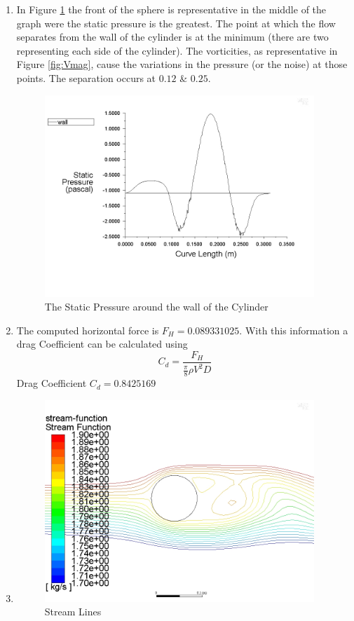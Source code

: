 \documentclass[11pt]{article}
\begin{document}
\begin{enumerate}
\item In Figure \ref{fig:pressure} the front of the sphere is representative in the
middle of the graph were the static pressure is the greatest. The point at which the flow separates from the wall of the cylinder is at the minimum (there are two representing each side of the cylinder). The vorticities, as representative in Figure \ref{fig:Vmag}, cause the variations in the pressure (or the noise) at those points. The separation occurs at  $0.12$ \& $0.25$.
\begin{figure}[H]
\centering
\includegraphics[width=4in]{curve_length_vs_static_pressure.jpg}
\caption{The Static Pressure around the wall of the Cylinder}
\label{fig:pressure}
\end{figure}

\item The computed horizontal force is $F_H = 0.089331025 $. With this information a drag
Coefficient can be calculated using $$C_d = \frac{F_H}{\frac{\pi}{8}\rho V^2 D}$$ Drag Coefficient $C_d = 0.8425169$ 

\item
\begin{figure}[H]
\centering
\includegraphics[width=4in]{stream_func.jpg}
\caption{Stream Lines}
\label{fig:Stream}
\end{figure}


\end{enumerate}
\end{document}
